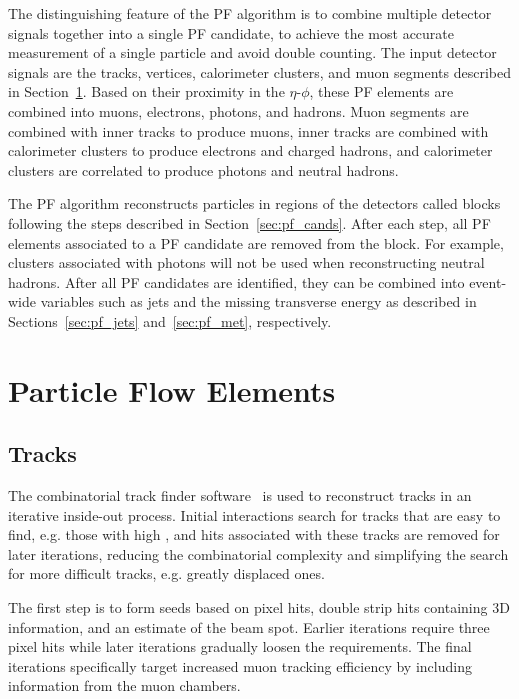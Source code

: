 The distinguishing feature of the PF algorithm is to combine multiple detector signals together into a single PF candidate, to achieve the most accurate measurement of a single particle and avoid double counting.
The input detector signals are the tracks, vertices, calorimeter clusters, and muon segments described in Section~\ref{sec:pf_elements}.
Based on their proximity in the $\eta$-$\phi$, these PF elements are combined into muons, electrons, photons, and hadrons.
Muon segments are combined with inner tracks to produce muons, inner tracks are combined with calorimeter clusters to produce electrons and charged hadrons, and calorimeter clusters are correlated to produce photons and neutral hadrons.

The PF algorithm reconstructs particles in regions of the detectors called blocks following the steps described in Section~\ref{sec:pf_cands}.
After each step, all PF elements associated to a PF candidate are removed from the block.
For example, clusters associated with photons will not be used when reconstructing neutral hadrons.
After all PF candidates are identified, they can be combined into event-wide variables such as jets and the missing transverse energy as described in Sections~\ref{sec:pf_jets} and~\ref{sec:pf_met}, respectively. 

\section{Particle Flow Elements}
\label{sec:pf_elements}

\subsection{Tracks}
\label{sec:pf_tracks}

The combinatorial track finder software~\cite{Tracker2014} is used to reconstruct tracks in an iterative inside-out process.
Initial interactions search for tracks that are easy to find, e.g. those with high \pt, and hits associated with these tracks are removed for later iterations, reducing the combinatorial complexity and simplifying the search for more difficult tracks, e.g. greatly displaced ones.

The first step is to form seeds based on pixel hits, double strip hits containing 3D information, and an estimate of the beam spot.
Earlier iterations require three pixel hits while later iterations gradually loosen the requirements. %
The final iterations specifically target increased muon tracking efficiency by including information from the muon chambers.

